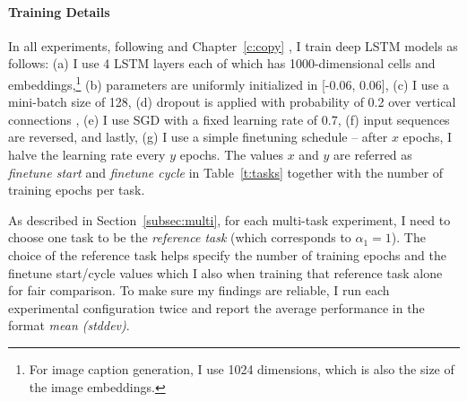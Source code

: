 \paragraph{Training Details}
In all experiments, following \citet{sutskever14} and Chapter~\ref{c:copy} \cite{luong15}, I train deep LSTM
models as follows: (a) I use 4 LSTM layers each of which has
1000-dimensional cells and embeddings,\footnote{For image caption generation, I use 1024
dimensions, which is also the size of the image embeddings.} (b) parameters are
uniformly initialized in [-0.06, 0.06], (c) I use a mini-batch size of 128, (d)
dropout is applied with probability of 0.2 over vertical connections
\citep{pham2014dropout}, (e) I use SGD with a fixed
learning rate of 0.7, (f) input sequences are reversed, and lastly, (g) I use a simple finetuning schedule -- after $x$
epochs, I halve the learning rate every $y$ epochs. The values $x$ and $y$
are referred as {\it finetune start} and {\it finetune cycle} in
Table~\ref{t:tasks} together with the number of training epochs per task.

As described in Section~\ref{subsec:multi}, for each multi-task
experiment, I need to choose one task to be the {\it reference
task} (which corresponds to $\alpha_1 = 1$). The choice of the
reference task helps specify the number of training epochs and the
finetune start/cycle values which I also when training that reference
task alone for fair comparison. To make sure my findings are
reliable, I run each experimental configuration twice and
report the average performance in the format {\it mean (stddev)}.

